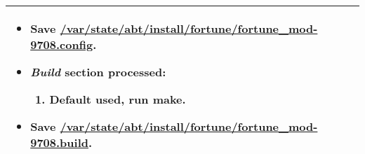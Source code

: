 \begin{tabularx}{\linewidth}{|l|X|}
\begin{minipage}{\linewidth}
\begin{itemize}
\begin{enumerate}
    \end{enumerate}
    \item Save \url{/var/state/abt/install/fortune/fortune_mod-9708.config}.
    \item \emph{Build} section processed:
    \begin{enumerate}
      \item Default used, run \textbf{make}.
    \end{enumerate}
    \item Save \url{/var/state/abt/install/fortune/fortune_mod-9708.build}.
  \end{itemize}
  \vspace{0.05em}
\end{minipage}
\\
\hline 
\end{tabularx}

